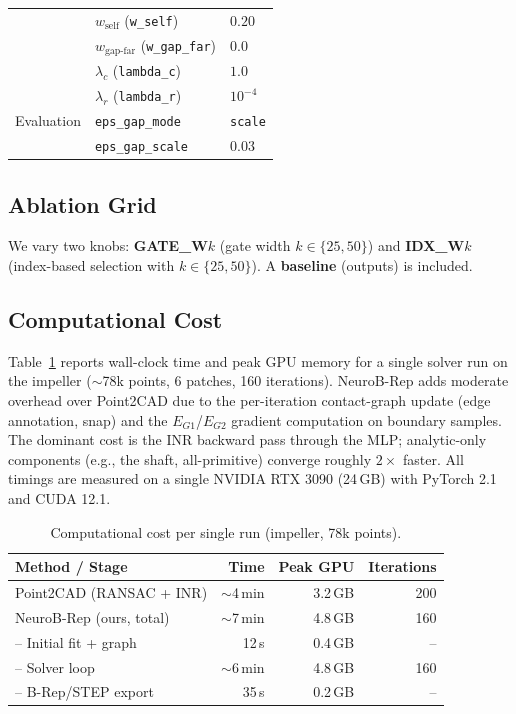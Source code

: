 \documentclass{ieeeaccess}
\begin{document}
\begin{table}[t]
\begin{tabular}{l l l}
    & $w_{\text{self}}$ (\texttt{w\_self}) & $0.20$ \\
    & $w_{\text{gap-far}}$ (\texttt{w\_gap\_far}) & $0.0$ \\
    & $\lambda_c$ (\texttt{lambda\_c}) & $1.0$ \\
    & $\lambda_r$ (\texttt{lambda\_r}) & $10^{-4}$ \\
    \midrule
    Evaluation &
      \texttt{eps\_gap\_mode} & \texttt{scale} \\
    & \texttt{eps\_gap\_scale} & $0.03$ \\
    \bottomrule
  \end{tabular}
\end{table}


\subsection{Ablation Grid}
We vary two knobs: \textbf{GATE\_W$k$} (gate width $k\in\{25,50\}$) and \textbf{IDX\_W$k$} (index-based selection with $k\in\{25,50\}$). A \textbf{baseline} (outputs) is included.

\subsection{Computational Cost}
\label{sec:cost}
Table~\ref{tab:cost} reports wall-clock time and peak GPU memory for a
single solver run on the impeller ($\sim$78k points, 6 patches, 160 iterations).
NeuroB-Rep adds moderate overhead over Point2CAD due to the per-iteration
contact-graph update (edge annotation, snap) and the $E_{G1}$/$E_{G2}$
gradient computation on boundary samples.
The dominant cost is the INR backward pass through the MLP; analytic-only
components (e.g., the shaft, all-primitive) converge roughly $2{\times}$
faster.
All timings are measured on a single NVIDIA RTX 3090 (24\,GB) with
PyTorch 2.1 and CUDA 12.1.

\begin{table}[t]
  \centering
  \footnotesize
  \setlength{\tabcolsep}{4pt}
  \caption{Computational cost per single run (impeller, 78k points).}
  \label{tab:cost}
  \begin{tabular}{l r r r}
    \toprule
    \textbf{Method / Stage} & \textbf{Time} & \textbf{Peak GPU} & \textbf{Iterations} \\
    \midrule
    Point2CAD (RANSAC + INR)   & $\sim$4\,min  & 3.2\,GB & 200 \\
    NeuroB-Rep (ours, total)   & $\sim$7\,min  & 4.8\,GB & 160 \\
    \quad-- Initial fit + graph & 12\,s         & 0.4\,GB & -- \\
    \quad-- Solver loop          & $\sim$6\,min  & 4.8\,GB & 160 \\
    \quad-- B-Rep/STEP export    & 35\,s         & 0.2\,GB & -- \\
    \bottomrule
  \end{tabular}
\end{table}
\end{document}
